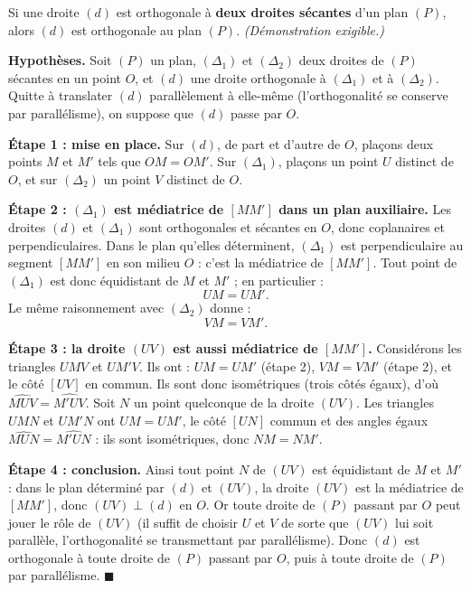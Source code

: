 \documentclass[11pt]{article}
\begin{document}
\begin{propriete}
Si une droite $(d)$ est orthogonale à \textbf{deux droites sécantes} d'un plan $(P)$, alors $(d)$ est orthogonale au plan $(P)$. \emph{(Démonstration exigible.)}
\end{propriete}

\begin{experience}
\textbf{Hypothèses.} Soit $(P)$ un plan, $(\Delta_1)$ et $(\Delta_2)$ deux droites de $(P)$ sécantes en un point $O$, et $(d)$ une droite orthogonale à $(\Delta_1)$ et à $(\Delta_2)$. Quitte à translater $(d)$ parallèlement à elle-même (l'orthogonalité se conserve par parallélisme), on suppose que $(d)$ passe par $O$.

\textbf{Étape 1 : mise en place.} Sur $(d)$, de part et d'autre de $O$, plaçons deux points $M$ et $M'$ tels que $OM = OM'$. Sur $(\Delta_1)$, plaçons un point $U$ distinct de $O$, et sur $(\Delta_2)$ un point $V$ distinct de $O$.

\textbf{Étape 2 : $(\Delta_1)$ est médiatrice de $[MM']$ dans un plan auxiliaire.} Les droites $(d)$ et $(\Delta_1)$ sont orthogonales et sécantes en $O$, donc coplanaires et perpendiculaires. Dans le plan qu'elles déterminent, $(\Delta_1)$ est perpendiculaire au segment $[MM']$ en son milieu $O$ : c'est la médiatrice de $[MM']$. Tout point de $(\Delta_1)$ est donc équidistant de $M$ et $M'$ ; en particulier :
\[ UM = UM'. \]
Le même raisonnement avec $(\Delta_2)$ donne :
\[ VM = VM'. \]

\textbf{Étape 3 : la droite $(UV)$ est aussi médiatrice de $[MM']$.} Considérons les triangles $UMV$ et $UM'V$. Ils ont : $UM = UM'$ (étape 2), $VM = VM'$ (étape 2), et le côté $[UV]$ en commun. Ils sont donc isométriques (trois côtés égaux), d'où $\widehat{MUV} = \widehat{M'UV}$. Soit $N$ un point quelconque de la droite $(UV)$. Les triangles $UMN$ et $UM'N$ ont $UM = UM'$, le côté $[UN]$ commun et des angles égaux $\widehat{MUN} = \widehat{M'UN}$ : ils sont isométriques, donc $NM = NM'$.

\textbf{Étape 4 : conclusion.} Ainsi tout point $N$ de $(UV)$ est équidistant de $M$ et $M'$ : dans le plan déterminé par $(d)$ et $(UV)$, la droite $(UV)$ est la médiatrice de $[MM']$, donc $(UV) \perp (d)$ en $O$. Or toute droite de $(P)$ passant par $O$ peut jouer le rôle de $(UV)$ (il suffit de choisir $U$ et $V$ de sorte que $(UV)$ lui soit parallèle, l'orthogonalité se transmettant par parallélisme). Donc $(d)$ est orthogonale à toute droite de $(P)$ passant par $O$, puis à toute droite de $(P)$ par parallélisme. \hfill $\blacksquare$
\end{experience}
\end{document}
